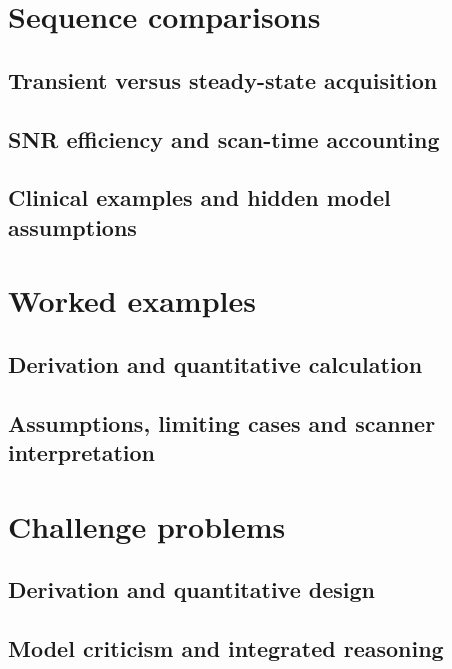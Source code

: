 \section{Sequence comparisons}
\label{sec:07:sequence-comparisons}
\subsection{Transient versus steady-state acquisition}
\subsection{SNR efficiency and scan-time accounting}
\subsection{Clinical examples and hidden model assumptions}

\section{Worked examples}
\label{sec:07:worked-examples}
\subsection{Derivation and quantitative calculation}
\subsection{Assumptions, limiting cases and scanner interpretation}

\section{Challenge problems}
\label{sec:07:challenge-problems}
\subsection{Derivation and quantitative design}
\subsection{Model criticism and integrated reasoning}
